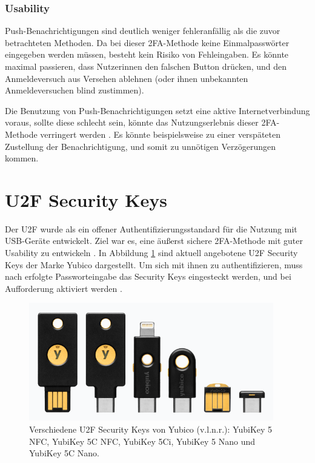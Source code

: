 \subsubsection{Usability}

Push-Benachrichtigungen sind deutlich weniger fehleranfällig als die zuvor betrachteten Methoden. Da bei dieser \ac{2FA}-Methode keine Einmalpasswörter eingegeben werden müssen, besteht kein Risiko von Fehleingaben. Es könnte maximal passieren, dass Nutzerinnen den falschen Button drücken, und den Anmeldeversuch aus Versehen ablehnen (oder ihnen unbekannten Anmeldeversuchen blind zustimmen).

Die Benutzung von Push-Benachrichtigungen setzt eine aktive Internetverbindung voraus, sollte diese schlecht sein, könnte das Nutzungserlebnis dieser \ac{2FA}-Methode verringert werden \parencite{reeseUsabilityStudy2019}. Es könnte beispielsweise zu einer verspäteten Zustellung der Benachrichtigung, und somit zu unnötigen Verzögerungen kommen.

\section{U2F Security Keys}
\label{sec:u2f}

Der \ac{U2F} wurde als ein offener Authentifizierungsstandard für die Nutzung mit USB-Geräte entwickelt. Ziel war es, eine äußerst sichere \ac{2FA}-Methode mit guter Usability zu entwickeln \parencite{langSecurityKeys2017}. In Abbildung \ref{fig:yubikey} sind aktuell angebotene \ac{U2F} Security Keys der Marke Yubico dargestellt. Um sich mit ihnen zu authentifizieren, muss nach erfolgte Passworteingabe das Security Keys eingesteckt werden, und bei Aufforderung aktiviert werden \parencite{reeseUsabilityStudy2019}.

\begin{figure}
  \begin{center}
    \includegraphics[width=0.95\textwidth]{assets/yubikey-5.png}
  \end{center}
  \caption[Verschiedene U2F Security Keys von Yubico]{Verschiedene U2F Security Keys von Yubico (v.l.n.r.): YubiKey 5 NFC, YubiKey 5C NFC, YubiKey 5Ci, YubiKey 5 Nano und YubiKey 5C Nano.\\\parencite{yubicoYubiKeySeries2024}}
  \label{fig:yubikey}
\end{figure}

